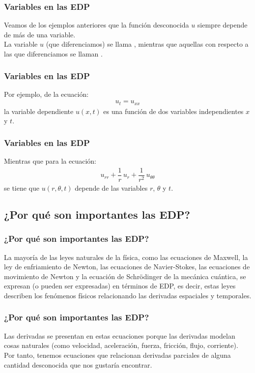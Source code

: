 \documentclass[12pt]{beamer}
\begin{document}
\begin{frame}
\frametitle{Variables en las EDP}
Veamos de los ejemplos anteriores que la función desconocida $u$ siempre depende de más de una variable.
\\
\bigskip
\pause
La variable $u$ (que diferenciamos) se llama , \pause mientras que aquellas con respecto a las que diferenciamos se llaman .
\end{frame}
\begin{frame}
\frametitle{Variables en las EDP}
Por ejemplo, de la ecuación:
\pause
\begin{align*}
u_{t} = u_{xx}
\end{align*}
la variable dependiente $u (x, t)$ es una función de dos variables independientes $x$ y $t$.
\end{frame}
\begin{frame}
\frametitle{Variables en las EDP}
Mientras que para la ecuación:
\pause
\begin{align*}
u_{rr} + \dfrac{1}{r} \, u_{r} + \dfrac{1}{r^{2}} \, u_{\theta \theta}
\end{align*}
se tiene que $u (r, \theta, t)$ depende de las variables $r$, $\theta$ y $t$.
\end{frame}

\subsection{¿Por qué son importantes las EDP?}

\begin{frame}
\frametitle{¿Por qué son importantes las EDP?}
La mayoría de las leyes naturales de la física, como las ecuaciones de Maxwell, \pause la ley de enfriamiento de Newton, \pause las ecuaciones de Navier-Stokes, \pause las ecuaciones de movimiento de Newton \pause y la ecuación de Schrödinger de la mecánica cuántica, \pause se expresan (o pueden ser expresadas) en términos de EDP, es decir, estas leyes describen los fenómenos físicos relacionando las derivadas espaciales y temporales.
\end{frame}
\begin{frame}
\frametitle{¿Por qué son importantes las EDP?}
Las derivadas se presentan en estas ecuaciones porque las derivadas modelan cosas naturales (como velocidad, aceleración, fuerza, fricción, flujo, corriente). 
\\
\bigskip
\pause
Por tanto, tenemos ecuaciones que relacionan derivadas parciales de alguna cantidad desconocida que nos gustaría encontrar.
\end{frame}
\end{document}
